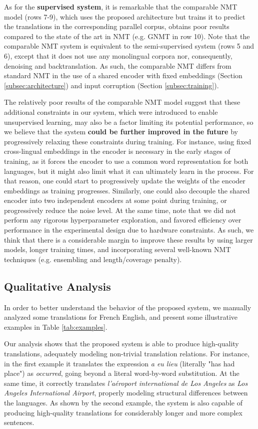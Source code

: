 \documentclass{article} \usepackage{iclr2018_conference,times}
\begin{document}
As for the \textbf{supervised system}, it is remarkable that the comparable NMT model (rows 7-9), which uses the proposed architecture but trains it to predict the translations in the corresponding parallel corpus, obtains poor results compared to the state of the art in NMT (e.g. GNMT in row 10). Note that the comparable NMT system is equivalent to the semi-supervised system (rows 5 and 6), except that it does not use any monolingual corpora nor, consequently, denoising and backtranslation. As such, the comparable NMT differs from standard NMT in the use of a shared encoder with fixed embeddings (Section \ref{subsec:architecture}) and input corruption (Section \ref{subsec:training}).

The relatively poor results of the comparable NMT model suggest that these additional constraints in our system, which were introduced to enable unsupervised learning, may also be a factor limiting its potential performance, so we believe that the system \textbf{could be further improved in the future} by progressively relaxing these constraints during training. For instance, using fixed cross-lingual embeddings in the encoder is necessary in the early stages of training, as it forces the encoder to use a common word representation for both languages, but it might also limit what it can ultimately learn in the process. For that reason, one could start to progressively update the weights of the encoder embeddings as training progresses. Similarly, one could also decouple the shared encoder into two independent encoders at some point during training, or progressively reduce the noise level. At the same time, note that we did not perform any rigorous hyperparameter exploration, and favored efficiency over performance in the experimental design due to hardware constraints. As such, we think that there is a considerable margin to improve these results by using larger models, longer training times, and incorporating several well-known NMT techniques (e.g. ensembling and length/coverage penalty).


\subsection{Qualitative Analysis}  \label{subsec:qualitative}

In order to better understand the behavior of the proposed system, we manually analyzed some translations for French  English, and present some illustrative examples in Table \ref{tab:examples}.

Our analysis shows that the proposed system is able to produce high-quality translations, adequately modeling non-trivial translation relations. For instance, in the first example it translates the expression \textit{a eu lieu} (literally "has had place") as \textit{occurred}, going beyond a literal word-by-word substitution. At the same time, it correctly translates \textit{l'aéroport international de Los Angeles} as \textit{Los Angeles International Airport}, properly modeling structural differences between the languages. As shown by the second example, the system is also capable of producing high-quality translations for considerably longer and more complex sentences.
\end{document}
